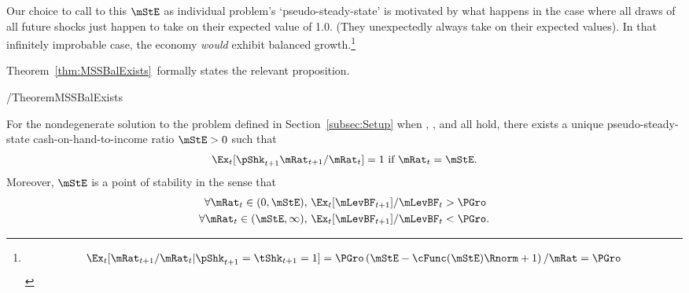 \documentclass[BufferStockTheory]{subfiles}
\begin{document}
Our choice to call to this $\mStE$ as individual problem's `pseudo-steady-state' is motivated by what happens in the case where all draws of all future shocks just happen to take on their expected value of 1.0.  (They unexpectedly always take on their expected values).  In that infinitely improbable case, the economy \textit{would} exhibit balanced growth.\footnote{    \begin{align*}      \Ex_{t}[\mRat_{t+1}/\mRat_{t}|\pShk_{t+1}=\tShk_{t+1}=1] = \PGro \left(\mStE-\cFunc(\mStE)\Rnorm + 1 \right)/\mRat = \PGro    \end{align*}}



Theorem~\ref{thm:MSSBalExists}~formally states the relevant proposition.
\begin{verbatimwrite}{\EqDir/TheoremMSSBalExists}
  \begin{theorem}\label{thm:MSSBalExists}
    For the nondegenerate solution to the problem defined in Section~\ref{subsec:Setup} when {\FVAC}, {\WRIC}, and {\GIC} all hold, there exists a unique pseudo-steady-state cash-on-hand-to-income ratio $\mStE>0$ such that
    \begin{equation}
      \Ex_t [\pShk_{t+1}{\mRat}_{t+1}/\mRat_t] = 1 \mbox{~if~} \mRat_t = \mStE.
      \label{eq:mStE}
    \end{equation}
    Moreover, $\mStE$ is a point of stability in the sense that
    \begin{equation}\label{eq:stabilityStE}
      \begin{split}
        \forall {\mRat}_t\in(0,\mStE),      \,\,& \Ex_{t}[\mLevBF_{t+1}]/\mLevBF_{t} > \PGro \\
        \forall {\mRat}_t\in(\mStE,\infty), \,\,& \Ex_{t}[\mLevBF_{t+1}]/\mLevBF_{t} < \PGro. 
      \end{split}
    \end{equation}
  \end{theorem}
\end{verbatimwrite}


\end{document}
